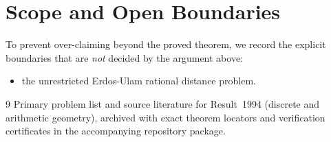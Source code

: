 \documentclass[10pt,reqno]{amsart}
\theoremstyle{definition}
\begin{document}
\section{Scope and Open Boundaries}

To prevent over-claiming beyond the proved theorem, we record the explicit boundaries that are \emph{not} decided by the argument above:
\begin{itemize}
  \item the unrestricted Erdos-Ulam rational distance problem.
\end{itemize}

\begin{thebibliography}{9}
Primary problem list and source literature for Result~1994 (discrete and arithmetic geometry), archived with exact theorem locators and verification certificates in the accompanying repository package.
\end{thebibliography}
\end{document}
